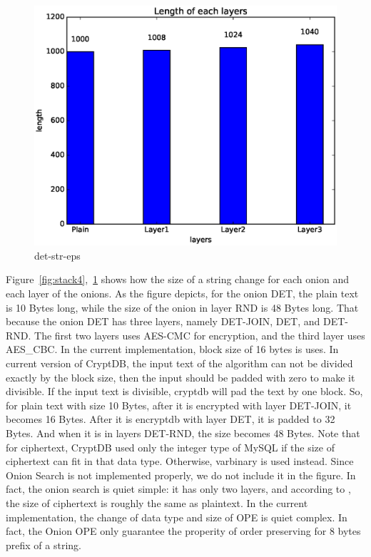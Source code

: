\begin{figure}[tb]
\centering
\includegraphics[width=\columnwidth]{images/det_str.eps}
\caption{det-str-eps}
\label{fig:stack5}
\end{figure}



Figure~\ref{fig:stack4},~\ref{fig:stack5} shows how the size of a string change for each onion and each layer of the onions. As the figure depicts, for the onion DET, the plain text is 10 Bytes long, while the size of the onion in layer RND is 48 Bytes long. That because the onion DET has three layers, namely DET-JOIN, DET, and DET-RND. The first two layers uses AES-CMC for encryption, and the third layer uses AES\_CBC. In the current implementation, block size of 16 bytes is uses. In current version of CryptDB, the input text of the algorithm can not be divided exactly by the block size, then the input should be padded with zero to make it divisible. If the input text is divisible, cryptdb will pad the text by one block. So, for plain text with size 10 Bytes, after it is encrypted with layer DET-JOIN, it becomes 16 Bytes. After it is encryptdb with layer DET, it is padded to 32 Bytes. And when it is in layers DET-RND, the size becomes 48 Bytes. Note that for ciphertext, CryptDB used only the integer type of MySQL if the size of ciphertext can fit in that data type. Otherwise, varbinary is used instead. Since Onion Search is not implemented properly, we do not include it in the figure. In fact, the onion search is quiet simple: it has only two layers, and according to \citep{song2000practical}, the size of ciphertext is roughly the same as plaintext. In the current implementation, the change of data type and size of OPE is quiet complex. In fact, the Onion OPE only guarantee the properity of order preserving for 8 bytes prefix of a string.




